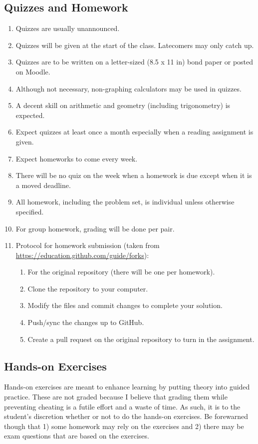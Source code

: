 \documentclass[10pt]{article}
\begin{document}
\subsection{Quizzes and Homework}
\begin{enumerate}[noitemsep]
\item Quizzes are usually unannounced.
\item Quizzes will be given at the start of the class. Latecomers may only catch up.
\item Quizzes are to be written on a letter-sized  (8.5 x 11 in) bond paper or posted on Moodle.
\item Although not necessary, non-graphing calculators may be used in quizzes.
\item A decent skill on arithmetic and geometry (including trigonometry) is expected.
\item Expect quizzes at least once a month especially when a reading assignment is given.
\item Expect homeworks to come every week.
\item There will be no quiz on the week when a homework is due except when it is a moved deadline.
\item All homework, including the problem set, is individual unless otherwise specified.
\item For group homework, grading will be done per pair.
\item Protocol for homework submission (taken from \url{https://education.github.com/guide/forks}):
	\begin{enumerate}
		\item For the original repository (there will be one per homework).
		\item Clone the repository to your computer.
		\item Modify the files and commit changes to complete your solution.
		\item Push/sync the changes up to GitHub.
		\item Create a pull request on the original repository to turn in the assignment.
	\end{enumerate}
\end{enumerate}

\subsection{Hands-on Exercises}
Hands-on exercises are meant to enhance learning by putting theory into guided practice. These are not graded because I believe that grading them while preventing cheating is a futile effort and a waste of time. As such, it is to the student's discretion whether or not to do the hands-on exercises. Be forewarned though that 1) some homework may rely on the exercises and 2) there may be exam questions that are based on the exercises.
\end{document}
